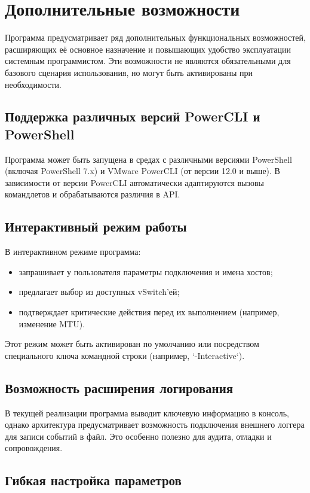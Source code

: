 \newpage
\section{Дополнительные возможности}

Программа предусматривает ряд дополнительных функциональных возможностей, расширяющих её основное назначение и повышающих удобство эксплуатации системным программистом. Эти возможности не являются обязательными для базового сценария использования, но могут быть активированы при необходимости.

\subsection{Поддержка различных версий PowerCLI и PowerShell}

Программа может быть запущена в средах с различными версиями PowerShell (включая PowerShell 7.x) и VMware PowerCLI (от версии 12.0 и выше). В зависимости от версии PowerCLI автоматически адаптируются вызовы командлетов и обрабатываются различия в API.

\subsection{Интерактивный режим работы}

В интерактивном режиме программа:
\begin{itemize}
  \item запрашивает у пользователя параметры подключения и имена хостов;
  \item предлагает выбор из доступных vSwitch’ей;
  \item подтверждает критические действия перед их выполнением (например, изменение MTU).
\end{itemize}

Этот режим может быть активирован по умолчанию или посредством специального ключа командной строки (например, `-Interactive`).

\subsection{Возможность расширения логирования}

В текущей реализации программа выводит ключевую информацию в консоль, однако архитектура предусматривает возможность подключения внешнего логгера для записи событий в файл. Это особенно полезно для аудита, отладки и сопровождения.

\subsection{Гибкая настройка параметров}

